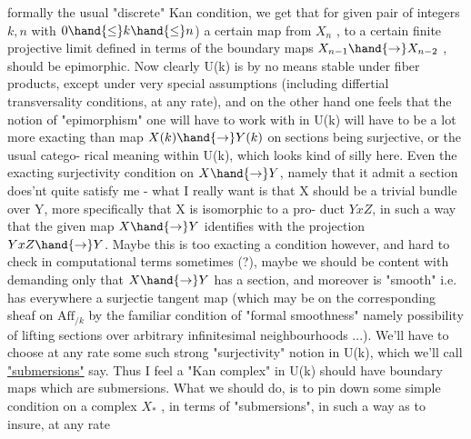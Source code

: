 
formally the usual "discrete" Kan condition, we get that \hand{(}for given pair
of integers $k,n$ with $0\hand{\leq}k\hand{\leq}n$) a certain map from $X_n$ , to a certain
 finite projective limit defined in terms of the boundary
maps $X_{n-1}\hand{\to}X_{n-2}$ , should be  epimorphic. Now clearly U(k)
is by no means stable under fiber products, except under very special
assumptions (including differtial transversality conditions, at any
rate), and on the other hand one feels that the notion of "epimorphism"
one will have to work with in U(k) will have to be a lot more exacting
than  map $X(k)\hand{\to}Y(k)$ on sections being surjective, or the usual catego-%
rical meaning within U(k), which looks kind of silly here. Even the 
exacting surjectivity condition on $X\hand{\to}Y$, namely that it admit a section\hand{\unsure{,}}
does'nt quite satisfy me - what I really want is that X should be a
trivial bundle over Y, more specifically that X is isomorphic to a pro-%
duct $YxZ$, in such a way that the given map $X\hand{\to}Y$ identifies with the
projection $YxZ\hand{\to}Y$. Maybe this is too exacting a condition however, and
hard to check in computational terms sometimes (?), maybe we should be
content with demanding only that $X\hand{\to}Y$ has a section, and moreover is
"smooth" i.e. has everywhere a surjectie tangent map (which may be
  on the corresponding sheaf on $\mathrm{Aff}_{/k}$ by the familiar condition
of "formal smoothness" namely possibility of lifting sections over
arbitrary infinitesimal neighbourhoods ...). We'll have to choose at any
rate some such  strong "surjectivity" notion in U(k), which we'll
call \uline{"submersions"} say. Thus I feel a "Kan complex" in U(k) should have
boundary maps which are submersions. What we should do, is to pin down
some simple  condition on a complex $X_*$ , in terms of "submersions",
in such a way as to insure, at any rate

